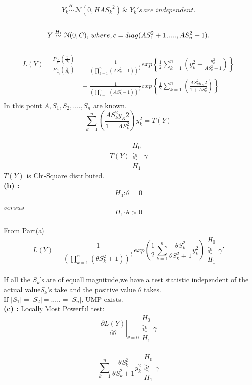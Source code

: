 \documentclass[a4paper,english,12pt]{article}
\begin{document}
$$Y_k\overset{H_0}{\sim} \mathcal{N}(0,HA{S_k}^2) \, \& \, \, Y_k's \, are \,\, independ
ent.$$\\
$$Y\overset{H_1}{\sim} \mathcal{N}(0,C), \, where \,\\,c=diag(AS_1^2+1,....,AS_n^2+1).$$\\
\begin{align*}
L(Y)=\frac{P_{\frac{Y}{H_1}}\left(\frac{y}{H_1}\right)}{P_{\frac{Y}{H_0}}\left(\frac{y}{H_0}\right)}&=\frac{1}{\left(\prod\limits_{k=1}
^{n}(AS_k^2+1)\right)^\frac{1}{2}}exp\left\{\frac{1}{2}\sum\limits_{k=1}^n(y_k^2-\frac{y_k^2}{AS_k^2+1})\right\}\\
&=\frac{1}{\left(\prod\limits_{k=1}
^{n}(AS_k^2+1)\right)^\frac{1}{2}}exp\left\{\frac{1}{2}\sum\limits_{k=1}^n\left(\frac{AS_k^2y_K2}{1+AS_k^2}\right) \right\}\\
\end{align*}
In this point $A,S_1,S_2,....,S_n$ are known.\\
$$\sum\limits_{k=1}^n\left(\frac{AS_k^2y_K2}{1+AS_k^2}\right)y_k^2=T(Y)$$\\
$$ T(Y) \substack{H_0\\\gtrless\\ H_1} \gamma$$
$T(Y)$ is Chi-Square distributed.\\
\textbf{(b) : }
$$H_0: \theta=0$$\\
$versus$\\ 
$$H_1:  \theta>0$$\\
From Part(a)\\
$$L(Y)=\frac{1}{\left(\prod\limits_{k=1}
^{n}(\theta S_k^2+1)\right)^\frac{1}{2}}exp\left(\frac{1}{2}\sum\limits_{k=1}^n\frac{\theta S_k^2}{\theta S_k^2+1}y_k^2\right)\substack{H_0\\\gtrless\\ H_1}\gamma\prime$$\\
If all the $S_k$'s are of equall magnitude,we have a test statistic independent of the actual value$S_k$'s take and the positive value $\theta$ takes.\\
If $|S_1|=|S_2|=.....=|S_n|$, UMP exists.\\
\textbf{(c) : }
Locally Most Powerful test:\\
$$\left.\frac{\partial L(Y)}{\partial\theta}\right|_{\theta=0}\substack{H_0\\\gtrless\\ H_1}\gamma$$\\
$$\sum\limits_{k=1}^n\frac{\theta S_k^2}{\theta S_k^2+1}y_k^2\substack{H_0\\\gtrless\\ H_1}\gamma$$\\
\end{document}
